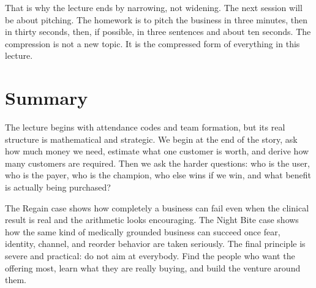 That is why the lecture ends by narrowing, not widening. The next session will be about pitching. The homework is to pitch the business in three minutes, then in thirty seconds, then, if possible, in three sentences and about ten seconds. The compression is not a new topic. It is the compressed form of everything in this lecture.

\section{Summary}

The lecture begins with attendance codes and team formation, but its real structure is mathematical and strategic. We begin at the end of the story, ask how much money we need, estimate what one customer is worth, and derive how many customers are required. Then we ask the harder questions: who is the user, who is the payer, who is the champion, who else wins if we win, and what benefit is actually being purchased?

The Regain case shows how completely a business can fail even when the clinical result is real and the arithmetic looks encouraging. The Night Bite case shows how the same kind of medically grounded business can succeed once fear, identity, channel, and reorder behavior are taken seriously. The final principle is severe and practical: do not aim at everybody. Find the people who want the offering most, learn what they are really buying, and build the venture around them.
